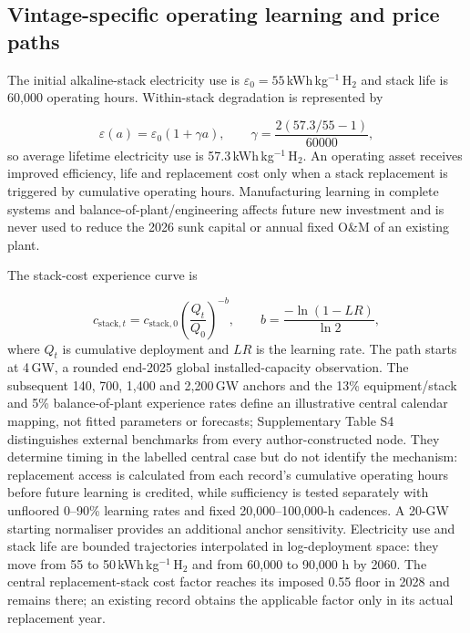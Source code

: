 \documentclass[11pt,a4paper]{article}
\begin{document}
\subsection*{Vintage-specific operating learning and price paths}

The initial alkaline-stack electricity use is $\varepsilon_0=55$\,kWh\,kg$^{-1}$\,H$_2$ and stack life is 60,000 operating hours. Within-stack degradation is represented by

\begin{equation}
\varepsilon(a)=\varepsilon_0(1+\gamma a), \qquad
\gamma=\frac{2(57.3/55-1)}{60000},
\label{eq:degradation}
\end{equation}
so average lifetime electricity use is 57.3\,kWh\,kg$^{-1}$\,H$_2$. An operating asset receives improved efficiency, life and replacement cost only when a stack replacement is triggered by cumulative operating hours. Manufacturing learning in complete systems and balance-of-plant/engineering affects future new investment and is never used to reduce the 2026 sunk capital or annual fixed O\&M of an existing plant.

The stack-cost experience curve is

\begin{equation}
c_{\mathrm{stack},t}=c_{\mathrm{stack},0}
\left(\frac{Q_t}{Q_0}\right)^{-b}, \qquad
b=\frac{-\ln(1-LR)}{\ln 2},
\label{eq:learning}
\end{equation}
where $Q_t$ is cumulative deployment and $LR$ is the learning rate. The path starts at 4\,GW, a rounded end-2025 global installed-capacity observation\cite{iea2026}. The subsequent 140, 700, 1,400 and 2,200\,GW anchors and the 13\% equipment/stack and 5\% balance-of-plant experience rates define an illustrative central calendar mapping, not fitted parameters or forecasts; Supplementary Table S4 distinguishes external benchmarks from every author-constructed node. They determine timing in the labelled central case but do not identify the mechanism: replacement access is calculated from each record's cumulative operating hours before future learning is credited, while sufficiency is tested separately with unfloored 0--90\% learning rates and fixed 20,000--100,000-h cadences. A 20-GW starting normaliser provides an additional anchor sensitivity. Electricity use and stack life are bounded trajectories interpolated in log-deployment space: they move from 55 to 50\,kWh\,kg$^{-1}$\,H$_2$ and from 60,000 to 90,000 h by 2060\cite{glenk2023,doe2024,worldbank2026,iea2025}. The central replacement-stack cost factor reaches its imposed 0.55 floor in 2028 and remains there; an existing record obtains the applicable factor only in its actual replacement year.
\end{document}
